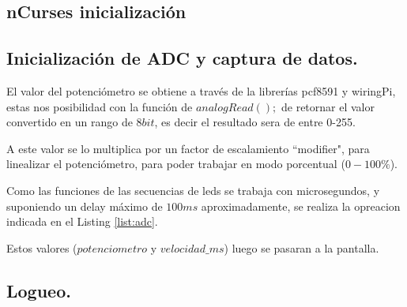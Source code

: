 \documentclass[11pt, a4paper]{article}
\begin{document}
\subsection{nCurses inicialización}



\subsection{Inicialización de ADC y captura de datos.}



El valor del potenciómetro se obtiene a través de la librerías pcf8591  y wiringPi, estas nos posibilidad con la función de $analogRead();$ de retornar el valor convertido en un rango de $8bit$, es decir el resultado sera de entre 0-255.

A este valor se lo multiplica por un factor de escalamiento ``modifier", para linealizar el potenciómetro, para poder trabajar en modo porcentual ($0-100\%$).

Como las funciones de las secuencias de leds se trabaja con microsegundos, y suponiendo un delay máximo de $100ms$ aproximadamente, se realiza la opreacion indicada en el Listing \ref{list:adc}. 

Estos valores ($potenciometro$ y $velocidad\_ms$) luego se pasaran a la pantalla.
\\

\subsection{Logueo.}

\end{document}
